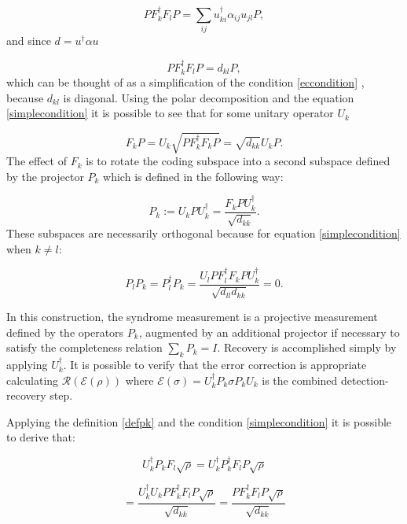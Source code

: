 \documentclass{article}
\begin{document}
\begin{equation}
	P F_k^\dagger F_l P = \sum_{ij} u_{ki}^\dagger \alpha_{ij} u_{jl} P,
\end{equation}
and since $d = u^\dagger \alpha u$

\begin{equation}
	\label{simplecondition}
	P F_k^\dagger F_l P = d_{kl}P,
\end{equation}
which can be thought of as a simplification of the condition \ref{eccondition} ,
because $d_{kl}$ is diagonal.
Using the polar decomposition and the equation \ref{simplecondition} it is
possible to see that for some unitary operator $U_k$

\begin{equation}
	F_k P = U_k \sqrt{PF_k^\dagger F_k P} = \sqrt{d_{kk}} U_k P.
\end{equation}
The effect of $F_k$ is to rotate the coding subspace into a second subspace defined by
the projector $P_k$ which is defined in the following way:

\begin{equation}
	\label{defpk}
	P_k := U_k P U_k^\dagger = \dfrac{F_k P U_k^\dagger}{\sqrt{d_{kk}}}.
\end{equation}
These subspaces are necessarily orthogonal because for equation \ref{simplecondition}
when $k \neq l$:

\begin{equation}
	P_l P_k = P_l^\dagger P_k = \dfrac{U_l P F_l^\dagger F_k P U_k^\dagger}{\sqrt{d_{ll}d_{kk}}} = 0.
\end{equation}

\noindent In this construction, the syndrome measurement is a projective measurement defined by
the operators $P_k$, augmented by an additional projector if necessary to satisfy
the completeness relation $\sum_k P_k = I$.
Recovery is accomplished simply by applying $U_k^\dagger$.
It is possible to verify that the error correction is appropriate calculating
$ \mathcal{R}(\mathcal{E}(\rho)) $ where $\mathcal{E}(\sigma) = U_k^\dagger P_k \sigma P_k U_k$
is the combined detection-recovery step.

\noindent Applying the definition \ref{defpk} and the condition \ref{simplecondition}
it is possible to derive that:

\begin{equation}
	U_k^\dagger P_k F_l \sqrt{\rho} = U_k^\dagger P_k^\dagger F_l P \sqrt{\rho}
\end{equation}

\begin{equation}
	=	\dfrac{U_k^\dagger U_k P F_k^\dagger F_l P \sqrt{\rho}}{\sqrt{d_{kk}}} = \dfrac{P F_k^\dagger F_l P \sqrt{\rho}}{\sqrt{d_{kk}}}
\end{equation}
\end{document}
